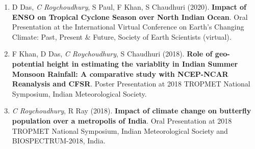 \documentclass[margin,line]{resume}
\begin{document}
\begin{resume}
\begin{enumerate}[topsep=1pt, partopsep=1pt, itemsep=0.5pt, parsep=0.1pt, leftmargin=15pt,label=\arabic*.]
			\item D Das, \textit{C Roychoudhury}, S Paul, F Khan, S Chaudhuri (2020). \textbf{Impact of ENSO on Tropical Cyclone Season over North Indian Ocean}. Oral Presentation at the International Virtual Conference on Earth's Changing Climate: Past, Present \& Future, Society of Earth Scientists (virtual).
				
			\item F Khan, D Das, \textit{C Roychoudhury}, S Chaudhuri (2018).		\textbf{Role of geo-potential height in estimating the variablity in Indian Summer Monsoon Rainfall: A comparative study with NCEP-NCAR Reanalysis and CFSR}. Poster Presentation at  %
			2018 TROPMET National Symposium, Indian Meteorological Society.
			
				\item \textit{C Roychoudhury}, R Ray (2018).
			\textbf{Impact of climate change on butterfly population over a metropolis of India}.
				Oral Presentation at %
				2018 TROPMET National Symposium, Indian Meteorological Society and BIOSPECTRUM-2018, India.
			
			
			
		\end{enumerate}
		

\end{resume}
\end{document}
